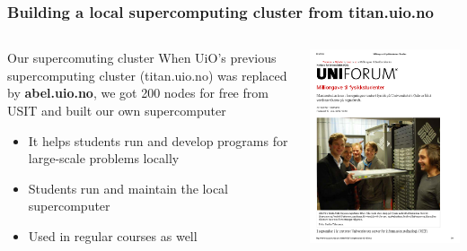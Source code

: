 \documentclass{beamer}
\begin{document}
\begin{frame}
\frametitle{Building a local supercomputing cluster from titan.uio.no}

\begin{columns}
\begin{block}{Our supercomuting cluster }
When UiO's previous supercomputing cluster (titan.uio.no) was replaced by \textbf{abel.uio.no}, we got 200 nodes for free from USIT and built our own supercomputer
\begin{itemize}
\item It helps students run and develop programs for large-scale problems locally

\item Students run and maintain the local supercomputer

\item Used in regular courses as well
\end{itemize}

\noindent
\end{block}

\centerline{\includegraphics[width=1.0\linewidth]{fig-future/uniforum-0.png}}



\end{columns}
\end{frame}
\end{document}
